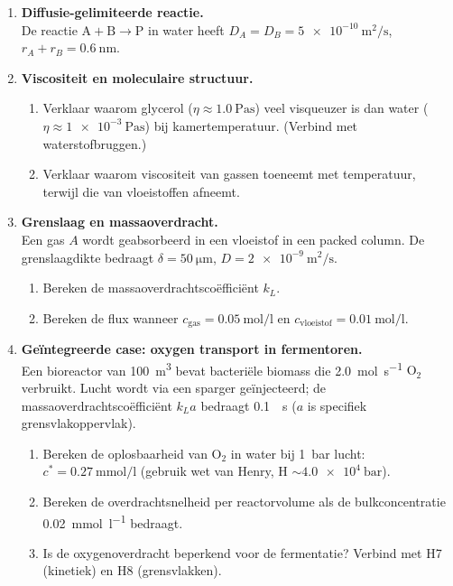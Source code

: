 \begin{enumerate}
\item \textbf{Diffusie-gelimiteerde reactie.} \\
De reactie $\mathrm{A + B \rightarrow P}$ in water heeft $D_A = D_B = \SI{5e-10}{\metre\squared\per\second}$, $r_A + r_B = \SI{0.6}{\nano\metre}$.

\item \textbf{Viscositeit en moleculaire structuur.} \\
\begin{enumerate}
\item[(a)] Verklaar waarom glycerol ($\eta \approx \SI{1.0}{\pascal\second}$) veel visqueuzer is dan water ($\eta \approx \SI{1e-3}{\pascal\second}$) bij kamertemperatuur. (Verbind met waterstofbruggen.)
\item[(b)] Verklaar waarom viscositeit van gassen toeneemt met temperatuur, terwijl die van vloeistoffen afneemt.
\end{enumerate}

\item \textbf{Grenslaag en massaoverdracht.} \\
Een gas $A$ wordt geabsorbeerd in een vloeistof in een packed column. De grenslaagdikte bedraagt $\delta = \SI{50}{\micro\metre}$, $D = \SI{2e-9}{\metre\squared\per\second}$.
\begin{enumerate}
\item[(a)] Bereken de massaoverdrachtsco\"effici\"ent $k_L$.
\item[(b)] Bereken de flux wanneer $c_{} = \SI{0.05}{\mole\per\litre}$ en $c_{} = \SI{0.01}{\mole\per\litre}$.
\end{enumerate}

\item \textbf{Ge\"integreerde case: oxygen transport in fermentoren.} \\
Een bioreactor van \SI{100}{\metre\cubed} bevat bacteri\"ele biomass die \SI{2.0}{\mole\per\second} $$ verbruikt. Lucht wordt via een sparger ge\"injecteerd; de massaoverdrachtsco\"effici\"ent $k_L a$ bedraagt \SI{0.1}{\per\second} ($a$ is specifiek grensvlakoppervlak).
\begin{enumerate}
\item[(a)] Bereken de oplosbaarheid van $$ in water bij \SI{1}{\bar} lucht: $c^* = \SI{0.27}{\milli\mole\per\litre}$ (gebruik wet van Henry, H $\sim \SI{4.0e4}{\bar}$).
\item[(b)] Bereken de overdrachtsnelheid per reactorvolume als de bulkconcentratie \SI{0.02}{\milli\mole\per\litre} bedraagt.
\item[(c)] Is de oxygenoverdracht beperkend voor de fermentatie? Verbind met H7 (kinetiek) en H8 (grensvlakken).
\end{enumerate}

\end{enumerate}

